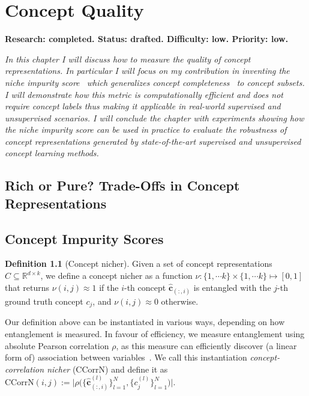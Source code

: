 \documentclass[withindex,glossary]{cam-thesis}
\theoremstyle{plain}
\theoremstyle{definition}
\newtheorem{definition}[theorem]{Definition}
\theoremstyle{remark}
\begin{document}
\chapter{Concept Quality} \label{chapter:metrics}
\textbf{Research: completed. Status: drafted. Difficulty: low. Priority: low.}

\textit{In this chapter I will discuss how to measure the quality of concept representations. In particular I will focus on my contribution in inventing the niche impurity score~\citep{zarlenga2021quality} which generalizes concept completeness~\citep{yeh2020completeness} to concept subsets. I will demonstrate how this metric is computationally efficient and does not require concept labels thus making it applicable in real-world supervised and unsupervised scenarios. I will conclude the chapter with experiments showing how the niche impurity score can be used in practice to evaluate the robustness of concept representations generated by state-of-the-art supervised and unsupervised concept learning methods.}

\section{Rich or Pure? Trade-Offs in Concept Representations}

\section{Concept Impurity Scores}
\begin{definition}[Concept nicher] \label{def:nicher}
Given a set of concept representations $\hat{C} \subseteq \mathbb{R}^{d \times k}$, we define a concept nicher as a function $\nu: \{1, \cdots k\} \times \{1, \cdots k\} \mapsto [0, 1]$ that returns $\nu(i, j) \approx 1$ if the $i$-th concept $\mathbf{\hat{c}}_{(:, i)}$ is entangled with the $j$-th ground truth concept $c_j$, and $\nu(i, j) \approx 0$ otherwise.
\end{definition}

Our definition above can be instantiated in various ways, depending on how entanglement is measured. In favour of efficiency, we measure entanglement using absolute Pearson correlation $\rho$, as this measure can efficiently discover (a linear form of) association between variables~\cite{altman2015points}. We call this instantiation  \emph{concept-correlation nicher} (CCorrN) and define it as
$\text{CCorrN}(i, j) := \big| \rho\big(\{\mathbf{\hat{c}}^{(l)}_{(:, i)}\}_{l=1}^N, \{c^{(l)}_j\}_{l=1}^N\big) \big|$.
\end{document}
